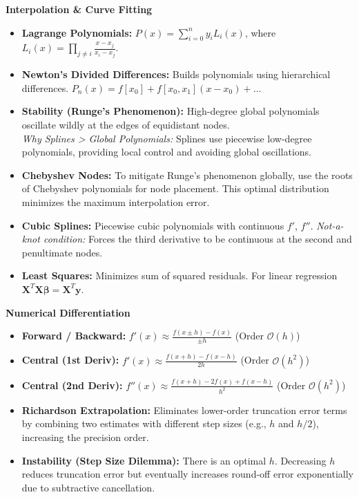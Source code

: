 \documentclass[10pt, landscape, twocolumn]{article}
\newcommand{\cheatsheetsubsection}[1]{
    \vspace{0.4em}
    {\color{themeblue}\normalsize\bfseries #1} \par
    \vspace{0.1em}
}
\begin{document}
\cheatsheetsubsection{Interpolation \& Curve Fitting}
\begin{itemize}[leftmargin=*, nosep]
    \item \textbf{Lagrange Polynomials:} $P(x) = \sum_{i=0}^n y_i L_i(x)$, where $L_i(x) = \prod_{j \neq i} \frac{x - x_j}{x_i - x_j}$.
    \item \textbf{Newton's Divided Differences:} Builds polynomials using hierarchical differences. $P_n(x) = f[x_0] + f[x_0, x_1](x-x_0) + \dots$
    \item \textbf{Stability (Runge's Phenomenon):} High-degree global polynomials oscillate wildly at the edges of equidistant nodes. \\
    \textit{Why Splines > Global Polynomials:} Splines use piecewise low-degree polynomials, providing local control and avoiding global oscillations.
    \item \textbf{Chebyshev Nodes:} To mitigate Runge's phenomenon globally, use the roots of Chebyshev polynomials for node placement. This optimal distribution minimizes the maximum interpolation error.
    \item \textbf{Cubic Splines:} Piecewise cubic polynomials with continuous $f'$, $f''$. 
    \textit{Not-a-knot condition:} Forces the third derivative to be continuous at the second and penultimate nodes.
    \item \textbf{Least Squares:} Minimizes sum of squared residuals. For linear regression $\mathbf{X}^T\mathbf{X}\boldsymbol{\beta} = \mathbf{X}^T\mathbf{y}$.
\end{itemize}

\cheatsheetsubsection{Numerical Differentiation}
\begin{itemize}[leftmargin=*, nosep]
    \item \textbf{Forward / Backward:} $f'(x) \approx \frac{f(x \pm h) - f(x)}{\pm h}$ (Order $\mathcal{O}(h)$)
    \item \textbf{Central (1st Deriv):} $f'(x) \approx \frac{f(x+h) - f(x-h)}{2h}$ (Order $\mathcal{O}(h^2)$)
    \item \textbf{Central (2nd Deriv):} $f''(x) \approx \frac{f(x+h) - 2f(x) + f(x-h)}{h^2}$ (Order $\mathcal{O}(h^2)$)
    \item \textbf{Richardson Extrapolation:} Eliminates lower-order truncation error terms by combining two estimates with different step sizes (e.g., $h$ and $h/2$), increasing the precision order.
    \item \textbf{Instability (Step Size Dilemma):} There is an optimal $h$. Decreasing $h$ reduces truncation error but eventually increases round-off error exponentially due to subtractive cancellation.
\end{itemize}
\end{document}
